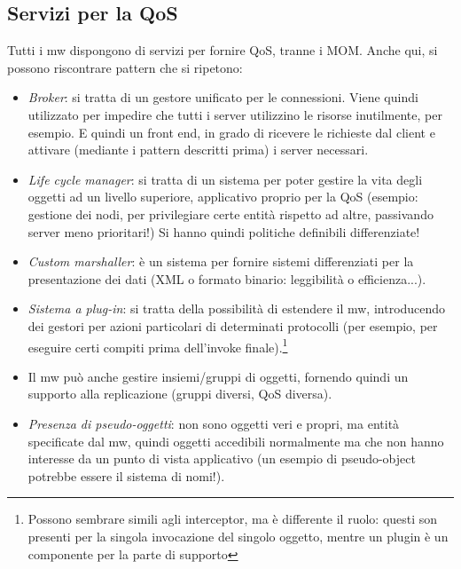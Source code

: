 \subsection{Servizi per la QoS}
Tutti i mw dispongono di servizi per fornire QoS, tranne i MOM. Anche qui, si possono riscontrare pattern che si
ripetono:
\begin{itemize}
 \item \textit{Broker}: si tratta di un gestore unificato per le connessioni. Viene quindi utilizzato per impedire
 che tutti i server utilizzino le risorse inutilmente, per esempio. E quindi un front end, in grado di ricevere le
 richieste dal client e attivare (mediante i pattern descritti prima) i server necessari.
 \item \textit{Life cycle manager}: si tratta di un sistema per poter gestire la vita degli oggetti ad un livello
 superiore, applicativo proprio per la QoS (esempio: gestione dei nodi, per privilegiare certe entità rispetto ad
 altre, passivando server meno prioritari!) Si hanno quindi politiche definibili differenziate!
 \item \textit{Custom marshaller}: è un sistema per fornire sistemi differenziati per la presentazione dei dati (XML
 o formato binario: leggibilità o efficienza...).
 \item \textit{Sistema a plug-in}: si tratta della possibilità di estendere il mw, introducendo dei gestori per azioni
 particolari di determinati protocolli (per esempio, per eseguire certi compiti prima dell'invoke
 finale).\footnote{Possono sembrare simili agli interceptor, ma è differente il ruolo: questi son presenti per la
 singola invocazione del singolo oggetto, mentre un plugin è un componente per la parte di supporto}
 \item Il mw può anche gestire insiemi/gruppi di oggetti, fornendo quindi un supporto alla replicazione (gruppi
 diversi, QoS diversa).
 \item \textit{Presenza di pseudo-oggetti}: non sono oggetti veri e propri, ma entità specificate dal mw, quindi
 oggetti accedibili normalmente ma che non hanno interesse da un punto di vista applicativo (un esempio di
 pseudo-object potrebbe essere il sistema di nomi!).
\end{itemize}